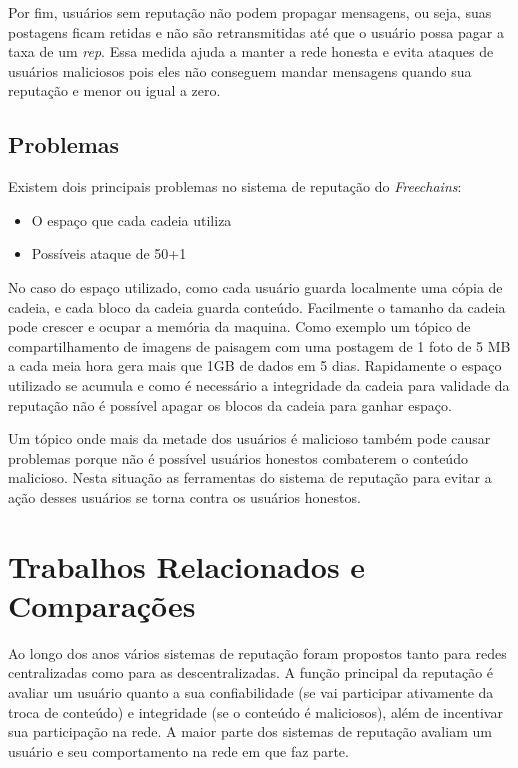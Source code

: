 \documentclass[12pt]{article}
\newcommand{\FC} {\emph{Freechains}\xspace}
\begin{document}
Por fim, usuários sem reputação não podem propagar mensagens, ou seja, suas postagens ficam retidas e não são retransmitidas até que o usuário possa pagar a taxa de um \emph{rep}. Essa medida ajuda a manter a rede honesta e evita ataques de usuários maliciosos pois eles não conseguem mandar mensagens quando sua reputação e menor ou igual a zero.

\subsection{Problemas} \label{subsec:fraq}

Existem dois principais problemas no sistema de reputação do \FC:

\begin{itemize}
    \item O espaço que cada cadeia utiliza
    \item Possíveis ataque de 50+1%
\end{itemize}

No caso do espaço utilizado, como cada usuário guarda localmente uma cópia de cadeia, e cada bloco da cadeia guarda conteúdo. Facilmente o tamanho da cadeia pode crescer e ocupar a memória da maquina. Como exemplo um tópico de compartilhamento de imagens de paisagem com uma postagem de 1 foto de 5 MB a cada meia hora gera mais que 1GB de dados em 5 dias. Rapidamente o espaço utilizado se acumula e como é necessário a integridade da cadeia para validade da reputação não é possível apagar os blocos da cadeia para ganhar espaço.

Um tópico onde mais da metade dos usuários é malicioso também pode causar problemas porque não é possível usuários honestos combaterem o conteúdo malicioso. Nesta situação as ferramentas do sistema de reputação para evitar a ação desses usuários se torna contra os usuários honestos.

\section{Trabalhos Relacionados e Comparações} \label{sec:trabrec}

Ao longo dos anos vários sistemas de reputação foram propostos tanto para redes centralizadas como para as descentralizadas. A função principal da reputação é avaliar um usuário quanto a sua confiabilidade (se vai participar ativamente da troca de conteúdo) e integridade (se o conteúdo é maliciosos), além de incentivar sua participação na rede. A maior parte dos sistemas de reputação avaliam um usuário e seu comportamento na rede em que faz parte. 
\end{document}
